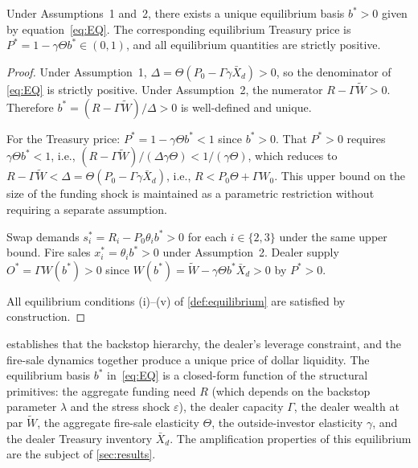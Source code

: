 \begin{proposition}
\label{prop:existence}
Under Assumptions~1 and~2, there exists a unique equilibrium basis $b^* > 0$ given by
equation~\eqref{eq:EQ}. The corresponding equilibrium Treasury price is
$P^* = 1 - \gamma\Theta b^* \in (0,1)$, and all equilibrium quantities are strictly positive.
\end{proposition}

\begin{proof}
Under Assumption~1, $\Delta = \Theta(P_0 - \Gamma\gamma\bar{X}_d) > 0$, so the denominator of
\eqref{eq:EQ} is strictly positive. Under Assumption~2, the numerator $R - \Gamma\tilde{W} > 0$.
Therefore $b^* = (R - \Gamma\tilde{W})/\Delta > 0$ is well-defined and unique.

For the Treasury price: $P^* = 1 - \gamma\Theta b^* < 1$ since $b^* > 0$. That $P^* > 0$ requires
$\gamma\Theta b^* < 1$, i.e., $(R - \Gamma\tilde{W})/(\Delta\gamma\Theta) < 1/(\gamma\Theta)$,
which reduces to $R - \Gamma\tilde{W} < \Delta = \Theta(P_0 - \Gamma\gamma\bar{X}_d)$, i.e.,
$R < P_0\Theta + \Gamma W_0$. This upper bound on the size of the funding shock is maintained
as a parametric restriction without requiring a separate assumption.

Swap demands $s_i^* = R_i - P_0\theta_i b^* > 0$ for each $i \in \{2,3\}$ under the same upper
bound. Fire sales $x_i^* = \theta_i b^* > 0$ under Assumption~2. Dealer supply
$O^* = \Gamma W(b^*) > 0$ since $W(b^*) = \tilde{W} - \gamma\Theta b^*\bar{X}_d > 0$
by $P^* > 0$.

All equilibrium conditions (i)--(v) of \cref{def:equilibrium} are satisfied by construction.
\end{proof}

 establishes that the backstop hierarchy, the dealer's
leverage constraint, and the fire-sale dynamics together produce a unique price of dollar
liquidity. The equilibrium basis $b^*$ in~\eqref{eq:EQ} is a closed-form function of the
structural primitives: the aggregate funding need $R$ (which depends on the backstop parameter
$\lambda$ and the stress shock $\varepsilon$), the dealer capacity $\Gamma$, the dealer wealth at par
$\tilde{W}$, the aggregate fire-sale elasticity $\Theta$, the outside-investor elasticity $\gamma$,
and the dealer Treasury inventory $\bar{X}_d$. The amplification properties of this equilibrium
are the subject of \cref{sec:results}.
